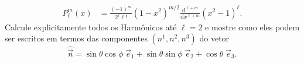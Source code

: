\begin{enumerate}
\begin{align}
		      P_\ell^m(x)           & = \frac{(-1)^m}{2^\ell \ell!}(1-x^2)^{m/2}\frac{\mathrm{d}^{\ell+m}}{\mathrm{d}x^{\ell+m}}(x^2-1)^\ell.
	      \end{align}
	      Calcule explicitamente todos os Harmônicos até $\ell=2$ e mostre como eles
	      podem ser escritos em termos das componentes $(n^1,n^2,n^3)$ do vetor
	      \begin{equation}
		      \hat{\vec{n}} = \sin\theta\cos\phi\;\vec{e}_1+\sin\theta\sin\phi\;\vec{e}_2+\cos\theta\;\vec{e}_3.
	      \end{equation}
\end{enumerate}


